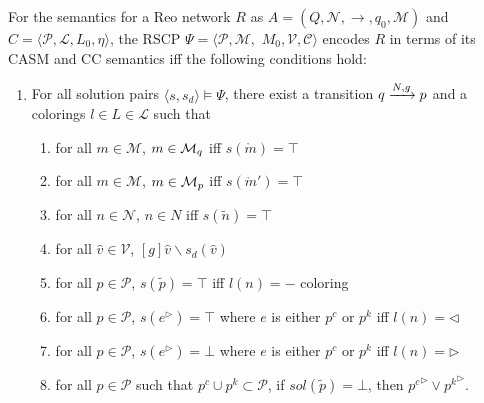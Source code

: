 \begin{definition}
\label{def:encoding}
For the semantics for a Reo network $R$ as $A = \left(Q, \mathcal{N}, \rightarrow, q_0, \mathcal{M}\right)$ and $C = \langle \mathcal{P}, \mathcal{L}, L_0, \eta \rangle$, the RSCP $\Psi = \langle \mathcal{P}, \mathcal{M},$ $M_0, \mathcal{V}, \mathcal{C} \rangle$ encodes $R$ in terms of its CASM and CC semantics iff the following conditions hold:

\begin{enumerate}
\item For all solution pairs $\langle s,s_d\rangle \vDash \Psi$, there exist a transition $q\xrightarrow{N,g}p$ and a colorings $l \in L \in \mathcal{L}$ such that 
   \begin{enumerate}
   \item for all $m \in \mathcal{M}$, $m \in {\cal{M}}_q$ iff $s(\mathring{m})=\top$  
   \item for all $m \in \mathcal{M}$, $m \in {\cal{M}}_p$ iff $s(\mathring{m}')=\top$
   \item for all $n \in \mathcal{N}$, $n \in N$ iff $s(\tilde{n})=\top$
   \item for all $\hat{v} \in \mathcal{V}$, $\left[g\right]\hat{v} \backslash s_d(\hat{v})$
   \item for all $p \in \mathcal{P}$, $s(\tilde{p})=\top$ iff $l(n) = -$ coloring
   \item for all $p \in \mathcal{P}$, $s({e}^\triangleright)=\top$ where $e$ is either $p^c$ or $p^k$  iff $l(n) = \triangleleft$
   \item for all $p \in \mathcal{P}$, $s({e}^\triangleright)=\bot$ where $e$ is either $p^c$ or $p^k$  iff $l(n) = \triangleright$
   \item for all  $p \in \mathcal{P}$ such that  $p^c \cup p^k \subset \mathcal{P}$, if $sol(\tilde{p})=\bot$, then ${p^c}^\triangleright \vee {p^k}^\triangleright$.
   \end{enumerate}
    

\end{enumerate}
\end{definition}
